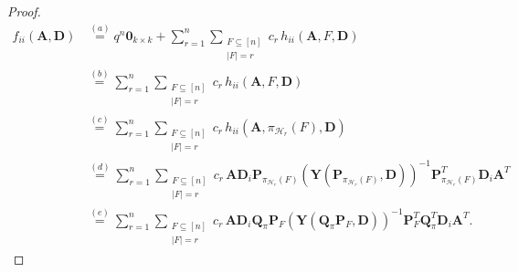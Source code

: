 \documentclass[journal,draftcls,onecolumn]{IEEEtran}
\theoremstyle{mystyle}
\newcommand{\bfD}{\mathbf{D}}
\newcommand{\bfQ}{\mathbf{Q}}
\newcommand{\bfP}{\mathbf{P}}
\begin{document}
\begin{proof}
\begin{align*}
f_{ii}(\mathbf{A}, \mathbf{D})
& \overset{(a)}= q^n  \mathbf{0}_{k \times k} + \sum_{r = 1}^n 
    \sum_{\substack{F \subseteq [n] \\ |F| = r}} c_r \, h_{ii}(\mathbf{A}, F, \mathbf{D})\\
& \overset{(b)}= \sum_{r = 1}^n 
    \sum_{\substack{F \subseteq [n] \\ |F| = r}}
    c_r \, h_{ii}(\mathbf{A}, F, \mathbf{D})\\
& \overset{(c)}= \sum_{r = 1}^n 
    \sum_{\substack{F \subseteq [n] \\ |F| = r}}
    c_r \,
    h_{ii}(\mathbf{A}, \pi_{\mathcal{H}_r}(F), \mathbf{D})\\
& \overset{(d)}= \sum_{r = 1}^n 
    \sum_{\substack{F \subseteq [n] \\ |F| = r}}
    c_r \,
   \mathbf{A}\mathbf{D}_i\mathbf{P}_{\pi_{\mathcal{H}_r}(F)} (\mathbf{Y}(\bfP_{\pi_{\mathcal{H}_r}(F)}, \bfD))^{-1}
    \mathbf{P}_{\pi_{\mathcal{H}_r}(F)}^T  \mathbf{D}_i\mathbf{A}^T\\ 
& \overset{(e)}= \sum_{r = 1}^n 
    \sum_{\substack{F \subseteq [n] \\ |F| = r}}
   c_r \,
   \mathbf{A}\mathbf{D}_i\bfQ_{\pi}\mathbf{P}_{F} (\mathbf{Y}(\bfQ_{\pi}\bfP_{F}, \bfD))^{-1}
    \mathbf{P}_{F}^T \bfQ_{\pi}^T \mathbf{D}_i\mathbf{A}^T.
\end{align*}









\end{proof}
\end{document}
